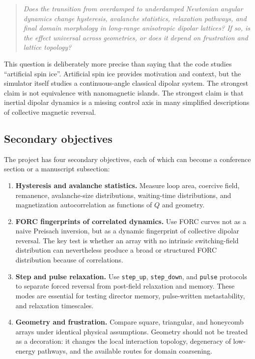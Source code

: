 \documentclass[11pt,a4paper]{article}
\newcommand{\code}[1]{\texttt{#1}}
\begin{document}
\begin{quote}\itshape
Does the transition from overdamped to underdamped Newtonian angular dynamics change hysteresis, avalanche statistics, relaxation pathways, and final domain morphology in long-range anisotropic dipolar lattices? If so, is the effect universal across geometries, or does it depend on frustration and lattice topology?
\end{quote}

This question is deliberately more precise than saying that the code studies ``artificial spin ice''. Artificial spin ice provides motivation and context, but the simulator itself studies a continuous-angle classical dipolar system. The strongest claim is not equivalence with nanomagnetic islands. The strongest claim is that inertial dipolar dynamics is a missing control axis in many simplified descriptions of collective magnetic reversal.

\subsection{Secondary objectives}

The project has four secondary objectives, each of which can become a conference section or a manuscript subsection:

\begin{enumerate}[leftmargin=*]
\item \textbf{Hysteresis and avalanche statistics.} Measure loop area, coercive field, remanence, avalanche-size distributions, waiting-time distributions, and magnetization autocorrelation as functions of $Q$ and geometry.
\item \textbf{FORC fingerprints of correlated dynamics.} Use FORC curves not as a naive Preisach inversion, but as a dynamic fingerprint of collective dipolar reversal. The key test is whether an array with no intrinsic switching-field distribution can nevertheless produce a broad or structured FORC distribution because of correlations.
\item \textbf{Step and pulse relaxation.} Use \code{step\_up}, \code{step\_down}, and \code{pulse} protocols to separate forced reversal from post-field relaxation and memory. These modes are essential for testing director memory, pulse-written metastability, and relaxation timescales.
\item \textbf{Geometry and frustration.} Compare square, triangular, and honeycomb arrays under identical physical assumptions. Geometry should not be treated as a decoration: it changes the local interaction topology, degeneracy of low-energy pathways, and the available routes for domain coarsening.
\end{enumerate}
\end{document}
